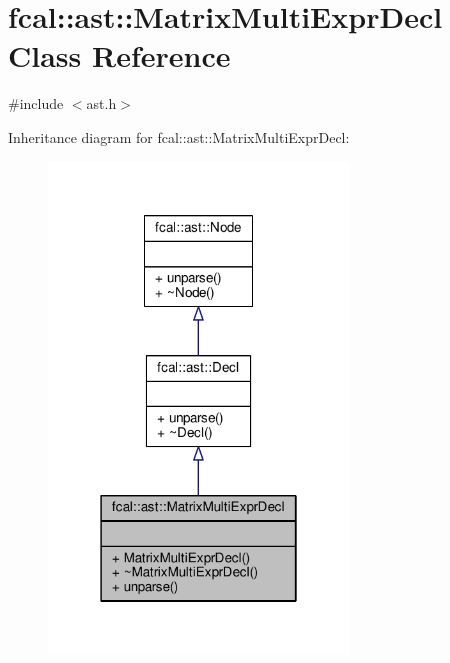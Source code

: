 \hypertarget{classfcal_1_1ast_1_1MatrixMultiExprDecl}{}\section{fcal\+:\+:ast\+:\+:Matrix\+Multi\+Expr\+Decl Class Reference}
\label{classfcal_1_1ast_1_1MatrixMultiExprDecl}


{\ttfamily \#include $<$ast.\+h$>$}



Inheritance diagram for fcal\+:\+:ast\+:\+:Matrix\+Multi\+Expr\+Decl\+:
\nopagebreak
\begin{figure}[H]
\begin{center}
\leavevmode
\includegraphics[width=226pt]{classfcal_1_1ast_1_1MatrixMultiExprDecl__inherit__graph}
\end{center}
\end{figure}


